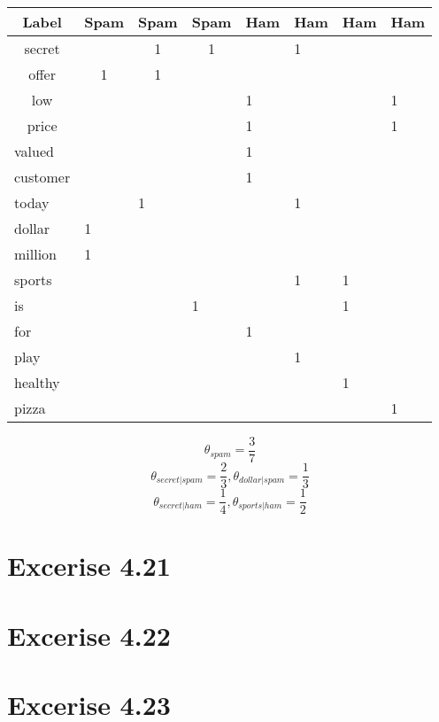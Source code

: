 \documentclass[12pt, letterpaper]{article}
\begin{document}
\begin{center}
\begin{tabular}{l|lllllll}
\multicolumn{1}{c|}{Label}  & \multicolumn{1}{c}{Spam} & \multicolumn{1}{c}{Spam} & \multicolumn{1}{c}{Spam} & Ham & Ham & Ham & Ham \\ \hline
\multicolumn{1}{c|}{secret} & \multicolumn{1}{c}{}     & \multicolumn{1}{c}{1}    & \multicolumn{1}{c}{1}    &     & 1   &     &     \\
\multicolumn{1}{c|}{offer} & \multicolumn{1}{c}{1} & \multicolumn{1}{c}{1} & \multicolumn{1}{c}{} &   &   &   &   \\
\multicolumn{1}{c|}{low}   & \multicolumn{1}{c}{}  & \multicolumn{1}{c}{}  & \multicolumn{1}{c}{} & 1 &   &   & 1 \\
\multicolumn{1}{c|}{price} & \multicolumn{1}{c}{}  & \multicolumn{1}{c}{}  & \multicolumn{1}{c}{} & 1 &   &   & 1 \\
valued                     &                       &                       &                      & 1 &   &   &   \\
customer                   &                       &                       &                      & 1 &   &   &   \\
today                      &                       & 1                     &                      &   & 1 &   &   \\
dollar                     & 1                     &                       &                      &   &   &   &   \\
million                    & 1                     &                       &                      &   &   &   &   \\
sports                     &                       &                       &                      &   & 1 & 1 &   \\
is                         &                       &                       & 1                    &   &   & 1 &   \\
for                        &                       &                       &                      & 1 &   &   &   \\
play                       &                       &                       &                      &   & 1 &   &   \\
healthy                    &                       &                       &                      &   &   & 1 &   \\
pizza                      &                       &                       &                      &   &   &   & 1
\end{tabular}
\end{center}

\[ \theta_{spam} = \frac{3}{7} \]
\[ \theta_{secret|spam} = \frac{2}{3}, \theta_{dollar|spam} = \frac{1}{3} \]
\[ \theta_{secret|ham} = \frac{1}{4}, \theta_{sports|ham} = \frac{1}{2} \]

\section{Excerise 4.21}

\section{Excerise 4.22}

\section{Excerise 4.23}
\end{document}
